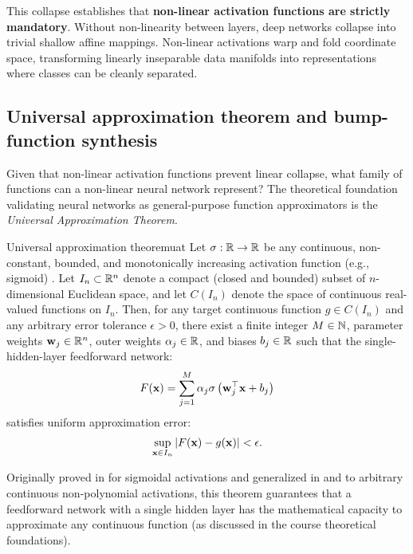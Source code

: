 \documentclass[../../main.tex]{subfiles}
\begin{document}
This collapse establishes that \textbf{non-linear activation functions are strictly mandatory}. Without non-linearity between layers, deep networks collapse into trivial shallow affine mappings. Non-linear activations warp and fold coordinate space, transforming linearly inseparable data manifolds into representations where classes can be cleanly separated.

\subsection{Universal approximation theorem and bump-function synthesis}
\label{subsec:uat_derivation}

Given that non-linear activation functions prevent linear collapse, what family of functions can a non-linear neural network represent? The theoretical foundation validating neural networks as general-purpose function approximators is the \emph{Universal Approximation Theorem}.

\begin{theorem}{Universal approximation theorem}{uat}
Let $\sigma: \mathbb{R} \to \mathbb{R}$ be any continuous, non-constant, bounded, and monotonically increasing activation function (e.g., sigmoid) \cite{cybenko1989}. Let $I_n \subset \mathbb{R}^n$ denote a compact (closed and bounded) subset of $n$-dimensional Euclidean space, and let $C(I_n)$ denote the space of continuous real-valued functions on $I_n$. Then, for any target continuous function $g \in C(I_n)$ and any arbitrary error tolerance $\epsilon > 0$, there exist a finite integer $M \in \mathbb{N}$, parameter weights $\mathbf{w}_j \in \mathbb{R}^n$, outer weights $\alpha_j \in \mathbb{R}$, and biases $b_j \in \mathbb{R}$ such that the single-hidden-layer feedforward network:
\begin{equation}
\label{eq:uat_form}
F(\mathbf{x}) = \sum_{j=1}^M \alpha_j \sigma\left( \mathbf{w}_j^\top \mathbf{x} + b_j \right)
\end{equation}
satisfies uniform approximation error:
\begin{equation}
\label{eq:uat_bound}
\sup_{\mathbf{x} \in I_n} \left| F(\mathbf{x}) - g(\mathbf{x}) \right| < \epsilon.
\end{equation}
\end{theorem}

Originally proved in \cite{cybenko1989} for sigmoidal activations and generalized in \cite{hornik1989} and \cite{leshno1993} to arbitrary continuous non-polynomial activations, this theorem guarantees that a feedforward network with a single hidden layer has the mathematical capacity to approximate any continuous function (as discussed in the course theoretical foundations).
\end{document}
